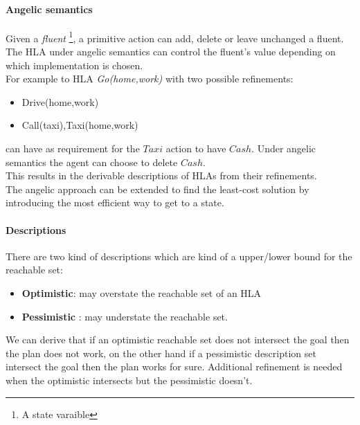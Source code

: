 \documentclass[5pt,a4paper]{article}
\begin{document}
\paragraph{Angelic semantics} 
Given a \textit{fluent} \footnote{A state varaible}, a primitive action can add, delete or leave unchanged a fluent. The HLA under angelic semantics can control the fluent's value depending on which implementation is chosen.\\
For example to HLA \textit{Go(home,work)} with two possible refinements:
\begin{itemize}
\item Drive(home,work)
\item Call(taxi),Taxi(home,work)
\end{itemize}
can have as requirement for the $Taxi$ action to have $Cash$. Under angelic semantics the agent can choose to delete $Cash$.\\
This results in the derivable descriptions of HLAs from their refinements.\\
The angelic approach can be extended to find the least-cost solution by introducing the most efficient way to get to a state.

\paragraph{Descriptions}
There are two kind of descriptions which are kind of a upper/lower bound for the reachable set:
\begin{itemize}
\item \textbf{Optimistic}: may overstate the reachable set of an HLA 
\item \textbf{Pessimistic} : may understate the reachable set.
\end{itemize}
We can derive that if an optimistic reachable set does not intersect the goal then the plan does not work, on the other hand if a pessimistic description set intersect the goal then the plan works for sure. Additional refinement is needed when the optimistic intersects but the pessimistic doesn't.
\end{document}

